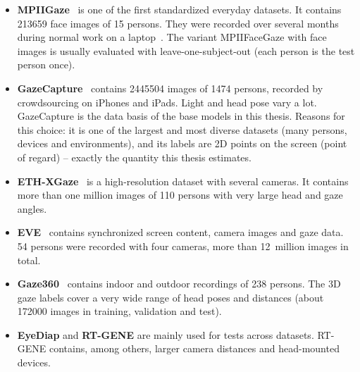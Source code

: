 \begin{itemize}
  \item \textbf{MPIIGaze}~\cite{zhang2015mpiigaze} is one of the first
        standardized everyday datasets. It contains \num{213659} face images of
        15 persons. They were recorded over several months during normal work
        on a laptop~\cite{zhang2019mpiigaze}. The variant MPIIFaceGaze with
        face images is usually evaluated with leave-one-subject-out (each
        person is the test person once).
  \item \textbf{GazeCapture}~\cite{krafka2016itracker} contains \num{2445504}
        images of \num{1474} persons, recorded by crowdsourcing on iPhones and
        iPads. Light and head pose vary a lot. GazeCapture is the data basis of
        the base models in this thesis. Reasons for this choice: it is one of
        the largest and most diverse datasets (many persons, devices and
        environments), and its labels are 2D points on the screen (point of
        regard) -- exactly the quantity this thesis estimates.
  \item \textbf{ETH-XGaze}~\cite{zhang2020ethxgaze} is a high-resolution
        dataset with several cameras. It contains more than one million images
        of 110 persons with very large head and gaze angles.
  \item \textbf{EVE}~\cite{park2020eve} contains synchronized screen content,
        camera images and gaze data. 54 persons were recorded with four
        cameras, more than 12~million images in total.
  \item \textbf{Gaze360}~\cite{kellnhofer2019gaze360} contains indoor and
        outdoor recordings of 238 persons. The 3D gaze labels cover a very wide
        range of head poses and distances (about \num{172000} images in
        training, validation and test).
  \item \textbf{EyeDiap} and \textbf{RT-GENE} are mainly used for tests across
        datasets. RT-GENE contains, among others, larger camera distances and
        head-mounted devices.
\end{itemize}

